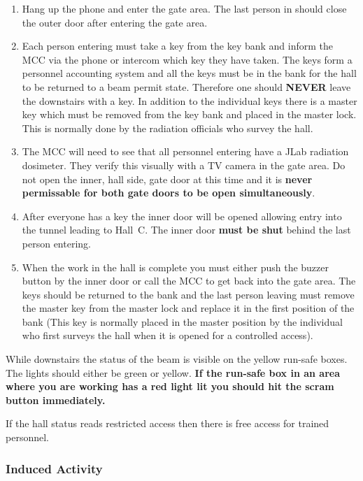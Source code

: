 {\begin{enumerate}
\item{Hang up the phone and enter the gate area. The last
person in should close the outer door after entering the gate area.}

\item{Each person entering must take a key from the key bank
and inform the MCC via the phone or intercom which key they have taken.
The keys form a personnel accounting system and all the keys must
be in the bank for the hall to be returned to a beam permit state.
Therefore one should {\bf NEVER} leave the downstairs with a key.
In addition to the individual keys there is a master key which
must be removed from the key bank and placed in the master lock. This
is normally done by the radiation officials who survey the hall.}

\item{The MCC will need to see that all personnel entering have
a JLab radiation dosimeter. They verify this visually with a TV camera in the gate area.
Do not open the inner, hall side, gate door at this time and
it is {\bf never permissable for both gate doors to be open 
simultaneously}.}

\item{After everyone has a key the inner door will be opened
allowing entry into the tunnel leading to Hall~C.
The inner door {\bf must be shut} behind the last person entering.}

\item{When the work in the hall is complete you must
either push the buzzer button by the inner door or call the
MCC to get back into the gate area.
The keys should be returned to the bank and the last person leaving
must remove the master key from
the master lock and replace it in the first position of the
bank (This key is normally placed in the master position by the individual who
first surveys the hall when it is opened for a controlled access).}

\end{enumerate}

While downstairs the status of the beam is visible on the yellow
run-safe boxes. The lights should either be green or yellow.
{\bf If the run-safe box in an area where you are working has a red
light lit you should hit the scram button immediately.}

If the hall status reads restricted access then there is free
access for trained personnel.

\subsubsection{Induced Activity}

}
